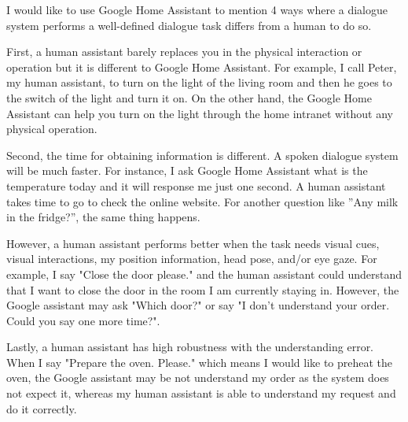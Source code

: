 \documentclass[12pt]{article}
\newenvironment{problem}[2][Problem]{\begin{trivlist}
\item[\hskip \labelsep {\bfseries #1}\hskip \labelsep {\bfseries #2.}]}{\end{trivlist}}
\begin{document}
\pagebreak
\begin{problem}{3.1}
    I would like to use Google Home Assistant to mention 4 ways where a dialogue 
    system performs a well-defined dialogue task differs from a human to do so.

    First, a human assistant barely replaces you in the physical interaction or 
    operation but it is different to Google Home Assistant. 
    For example, I call Peter, my human assistant, to turn on the light of 
    the living room and then he goes to the switch of the light and turn it on. 
    On the other hand, the Google Home Assistant can help you turn on the light 
    through the home intranet without any physical operation. 
    
    Second, the time for obtaining information is different. 
    A spoken dialogue system will be much faster. 
    For instance, I ask Google Home Assistant what is the temperature today and 
    it will response me just one second. 
    A human assistant takes time to go to check the online website. 
    For another question like ”Any milk in the fridge?”, the same thing happens. 
    
    However, a human assistant performs better when the task needs visual cues, 
    visual interactions, my position information, head pose, and/or eye gaze. 
    For example, I say "Close the door please." and the human assistant could 
    understand that I want to close the door in the room I am currently staying in. 
    However, the Google assistant may ask "Which door?" or say 
    "I don’t understand your order. Could you say one more time?".
    
    Lastly, a human assistant has high robustness with the understanding error. 
    When I say "Prepare the oven. Please." which means I would like to preheat 
    the oven, the Google assistant may be not understand my order as the system 
    does not expect it, whereas my human assistant is able to understand 
    my request and do it correctly.
\end{problem}
\end{document}
